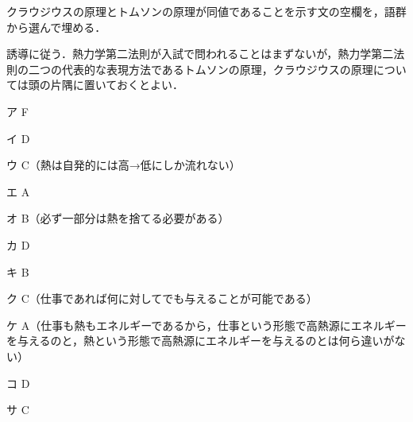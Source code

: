 \begin{multicols}{2}
\begin{saikei}
クラウジウスの原理とトムソンの原理が同値であることを示す文の空欄を，語群から選んで埋める．
\end{saikei}
\begin{sisin}
誘導に従う．熱力学第二法則が入試で問われることはまずないが，熱力学第二法則の二つの代表的な表現方法であるトムソンの原理，クラウジウスの原理については頭の片隅に置いておくとよい．
\end{sisin}
\begin{kaitou}
\begin{list}{}{%
  \setlength{\leftmargin}{3zw}\setlength{\labelwidth}{1.5zw}%
  \setlength{\labelsep}{1zw}\setlength{\itemsep}{0pt}%
  \setlength{\parsep}{0pt}\setlength{\topsep}{2pt}\setlength{\partopsep}{0pt}}
\item[ア] F
\item[イ] D
\item[ウ] C（熱は自発的には高→低にしか流れない）
\item[エ] A
\item[オ] B（必ず一部分は熱を捨てる必要がある）
\item[カ] D
\item[キ] B
\item[ク] C（仕事であれば何に対してでも与えることが可能である）
\item[ケ] A（仕事も熱もエネルギーであるから，仕事という形態で高熱源にエネルギーを与えるのと，熱という形態で高熱源にエネルギーを与えるのとは何ら違いがない）
\item[コ] D
\item[サ] C
\end{list}

\end{kaitou}
\end{multicols}
